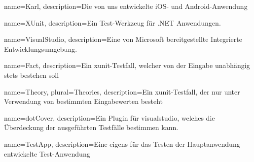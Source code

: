 {
	name=Karl,
	description={Die von uns entwickelte iOS- und Android-Anwendung}
}

{
	name=XUnit,
	description={Ein Test-Werkzeug für .NET Anwendungen. }
}

{
	name=VisualStudio,
	description={Eine von Microsoft bereitgestellte Integrierte Entwicklungsumgebung. }
}

{
	name=Fact,
	description={Ein \Gls{xunit}-Testfall, welcher von der Eingabe unabhängig stets bestehen soll}
}

{
	name=Theory,
	plural=Theories,
	description={Ein \Gls{xunit}-Testfall, der nur unter Verwendung von bestimmten Eingabewerten besteht}
}

{
	name=dotCover,
	description={Ein Plugin für \Gls{visualstudio}, welches die Überdeckung der ausgeführten Testfälle bestimmen kann. }
}

{
	name=TestApp,
	description={Eine eigens für das Testen der Hauptanwendung entwickelte Test-Anwendung}
}
